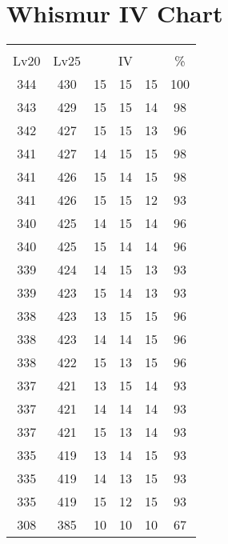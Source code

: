 \documentclass{article}%
\begin{document}
%
\normalsize%
\section{Whismur IV Chart}%
\label{sec:Whismur IV Chart}%
\renewcommand{\arraystretch}{1.5}%
\begin{tabular}{|c|c|c|c|c|c|}%
\hline%
\multicolumn{6}{|c|}{\textcolor{white}{ 
\linebreak{Whismur}
}%
\cellcolor{black}}\\%
\multicolumn{1}{|c}{Lv20}&\multicolumn{1}{c|}{Lv25}&\multicolumn{3}{c|}{IV}&\multicolumn{1}{|c|}{\%}\\%
\hline%
\rowcolor{color100}%
344&430&15&15&15&100\\%
\hline%
\rowcolor{color98}%
343&429&15&15&14&98\\%
\hline%
\rowcolor{color96}%
342&427&15&15&13&96\\%
\hline%
\rowcolor{color98}%
341&427&14&15&15&98\\%
\hline%
\rowcolor{color98}%
341&426&15&14&15&98\\%
\hline%
\rowcolor{color93}%
341&426&15&15&12&93\\%
\hline%
\rowcolor{color96}%
340&425&14&15&14&96\\%
\hline%
\rowcolor{color96}%
340&425&15&14&14&96\\%
\hline%
\rowcolor{color93}%
339&424&14&15&13&93\\%
\hline%
\rowcolor{color93}%
339&423&15&14&13&93\\%
\hline%
\rowcolor{color96}%
338&423&13&15&15&96\\%
\hline%
\rowcolor{color96}%
338&423&14&14&15&96\\%
\hline%
\rowcolor{color96}%
338&422&15&13&15&96\\%
\hline%
\rowcolor{color93}%
337&421&13&15&14&93\\%
\hline%
\rowcolor{color93}%
337&421&14&14&14&93\\%
\hline%
\rowcolor{color93}%
337&421&15&13&14&93\\%
\hline%
\rowcolor{color93}%
335&419&13&14&15&93\\%
\hline%
\rowcolor{color93}%
335&419&14&13&15&93\\%
\hline%
\rowcolor{color93}%
335&419&15&12&15&93\\%
\hline%
\rowcolor{color91}%
308&385&10&10&10&67\\%
\end{tabular}

%
\end{document}

